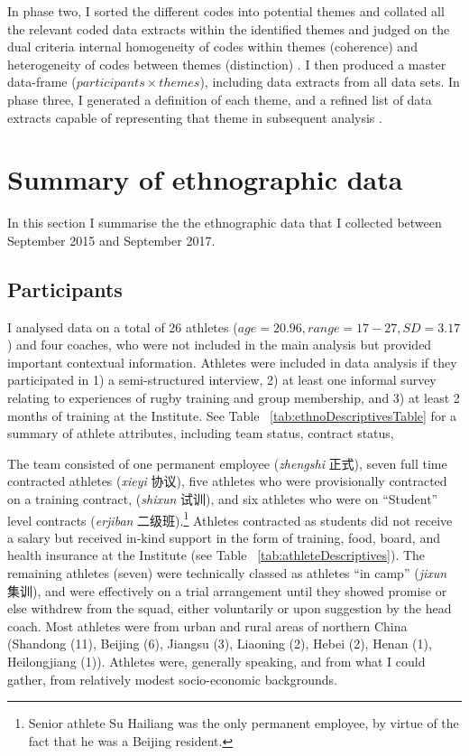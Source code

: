 \begin{CJK}{UTF8}{gbsn}
In phase two, I sorted the different codes into potential themes and collated all the relevant coded data extracts within the identified themes and judged on the dual criteria internal homogeneity of codes within themes (coherence) and heterogeneity of codes between themes (distinction) \citep{Patton1990}.  I then produced a master data-frame ($ participants \times themes$), including data extracts from all data sets. In phase three, I generated a definition of each theme, and a refined list of data extracts capable of representing that theme in subsequent analysis \citep{Braun2006}.




\section{Summary of ethnographic data}
In this section I summarise the the ethnographic data that I collected between September 2015 and September 2017.

\subsection{Participants}
I analysed data on a total of 26 athletes ($age = 20.96, range = 17-27, SD = 3.17$) and four coaches, who were not included in the main analysis but provided important contextual information.  Athletes were included in data analysis if they participated in 1) a semi-structured interview, 2) at least one informal survey relating to experiences of rugby training and group membership, and 3) at least 2 months of training at the Institute.  See Table ~\ref{tab:ethnoDescriptivesTable} for a summary of athlete attributes, including team status, contract status,



The team consisted of one permanent employee (\textit{zhengshi} 正式), seven full time contracted athletes (\textit{xieyi} 协议), five athletes who were provisionally contracted on a training contract, (\textit{shixun} 试训), and six athletes who were on ``Student'' level contracts (\textit{erjiban} 二级班).\footnote{Senior athlete Su Hailiang was the only permanent employee, by virtue of the fact that he was a Beijing resident.}  Athletes contracted as students did not receive a salary but received in-kind support in the form of training, food, board, and health insurance at the Institute (see Table ~\ref{tab:athleteDescriptives}).  The remaining athletes (seven) were technically classed as athletes ``in camp'' (\textit{jixun} 集训), and were effectively on a trial arrangement until they showed promise or else withdrew from the squad, either voluntarily or upon suggestion by the head coach.  Most athletes were from urban and rural areas of northern China (Shandong (11), Beijing (6), Jiangsu (3), Liaoning (2), Hebei (2), Henan (1), Heilongjiang (1)). Athletes were, generally speaking, and from what I could gather, from relatively modest socio-economic backgrounds.


\end{CJK}
